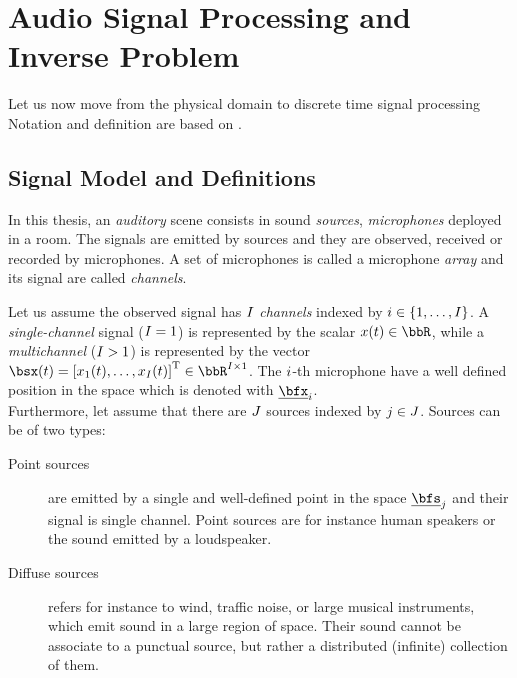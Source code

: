 \chapter{Audio Signal Processing and Inverse Problem}\label{ch:processing}
\vspace{-2.5em}
 Let us now move from the physical domain to discrete time
signal processing
\blindtext[1]
Notation and definition are based on \cite{gannot2017consolidated}.

\section{Signal Model and Definitions}
In this thesis, an \textit{auditory} scene consists in sound \textit{sources}, \textit{microphones} deployed in a room.
The signals are emitted by sources and they are observed, received or recorded by microphones.
A set of microphones is called a microphone \textit{array} and its signal are called \textit{channels}.

Let us assume the observed signal has $I$ \textit{channels} indexed by $\idxMic \in \kbrace{1,\dots,\numMics}$.
A \textit{single-channel} signal ($I = 1$) is represented by the scalar $\mic(t) \in \bbR$,
while a \textit{multichannel} ($I >   1$) is represented by the vector
$\mics(t) = \ktranspose{\klist{\mic_1(t), \dots, \mic_{\numMics}(t)}} \in \bbR^{\numMics \times 1}$.
The $i$-th microphone have a well defined position in the space which is denoted with $\positionMicrophone_\idxMic$.
\\Furthermore, let assume that there are $J$ sources indexed by $j \in J$.
Sources can be of two types:
\begin{description}
    \item[Point sources] are emitted by a single and well-defined point in the space $\positionSource_\idxSrc$ and their signal is single channel.
    Point sources are for instance human speakers or the sound emitted by a loudspeaker.
    \item[Diffuse sources] refers for instance to wind, traffic noise, or large musical instruments, which emit sound in a large region of space.
    Their sound cannot be associate to a punctual source, but rather a distributed (infinite) collection of them.
\end{description}

